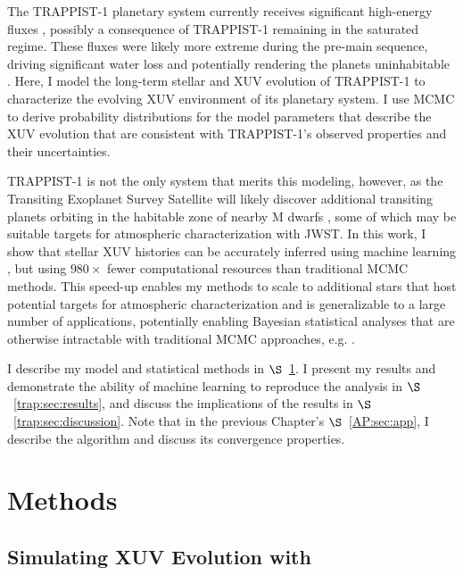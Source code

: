 The TRAPPIST-1 planetary system currently receives significant high-energy fluxes \citep{Bourrier2017b,Wheatley2017,Peacock2019}, possibly a consequence of TRAPPIST-1 remaining in the saturated regime. These fluxes were likely more extreme during the pre-main sequence, driving significant water loss and potentially rendering the planets uninhabitable \citep{Bolmont2017,Bourrier2017a}. Here, I model the long-term stellar and XUV evolution of TRAPPIST-1 to characterize the evolving XUV environment of its planetary system. I use MCMC to derive probability distributions for the model parameters that describe the XUV evolution that are consistent with TRAPPIST-1's observed properties and their uncertainties.

TRAPPIST-1 is not the only system that merits this modeling, however, as the Transiting Exoplanet Survey Satellite will likely discover additional transiting planets orbiting in the habitable zone of nearby M dwarfs \citep{Barclay2018}, some of which may be suitable targets for atmospheric characterization with JWST. In this work, I show that stellar XUV histories can be accurately inferred using machine learning \citep[\approxposterior, ][]{FlemingVanderPlas2018}, but using $980\times$ fewer computational resources than traditional MCMC methods. This speed-up enables my methods to scale to additional stars that host potential targets for atmospheric characterization and is generalizable to a large number of applications, potentially enabling Bayesian statistical analyses that are otherwise intractable with traditional MCMC approaches, e.g. \emcee \citep{ForemanMackey2013}.

I describe my model and statistical methods in $\S$~\ref{trap:sec:methods}. I present my results and demonstrate the ability of machine learning to reproduce the analysis in $\S$~\ref{trap:sec:results}, and discuss the implications of the results in $\S$~\ref{trap:sec:discussion}. Note that in the previous Chapter's $\S$~\ref{AP:sec:app}, I describe the \approxposterior algorithm and discuss its convergence properties.

\section{Methods} \label{trap:sec:methods}

\subsection{Simulating XUV Evolution with \vplanet} \label{trap:sec:model}

